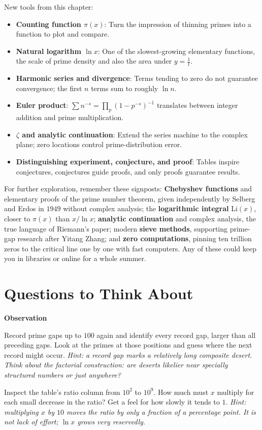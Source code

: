 \begin{toolbox}
New tools from this chapter:
\begin{itemize}
  \item \textbf{Counting function $\pi(x)$}: Turn the impression of thinning primes into a function to plot and compare.
  \item \textbf{Natural logarithm $\ln x$}: One of the slowest-growing elementary functions, the scale of prime density and also the area under $y=\frac1t$.
  \item \textbf{Harmonic series and divergence}: Terms tending to zero do not guarantee convergence; the first $n$ terms sum to roughly $\ln n$.
  \item \textbf{Euler product}: $\sum n^{-s}=\prod_{p}(1-p^{-s})^{-1}$ translates between integer addition and prime multiplication.
  \item \textbf{$\zeta$ and analytic continuation}: Extend the series machine to the complex plane; zero locations control prime-distribution error.
  \item \textbf{Distinguishing experiment, conjecture, and proof}: Tables inspire conjectures, conjectures guide proofs, and only proofs guarantee results.
\end{itemize}
\end{toolbox}

\begin{pandeng}
For further exploration, remember these signposts: \textbf{Chebyshev functions} and elementary proofs of the prime number theorem, given independently by Selberg and Erdos in $1949$ without complex analysis; the \textbf{logarithmic integral} $\mathrm{Li}(x)$, closer to $\pi(x)$ than $x/\ln x$; \textbf{analytic continuation} and complex analysis, the true language of Riemann's paper; modern \textbf{sieve methods}, supporting prime-gap research after Yitang Zhang; and \textbf{zero computations}, pinning ten trillion zeros to the critical line one by one with fast computers. Any of these could keep you in libraries or online for a whole summer.
\end{pandeng}

\section*{Questions to Think About}

\textbf{Observation}
\begin{sikao}
  \item Record prime gaps up to $100$ again and identify every record gap, larger than all preceding gaps. Look at the primes at those positions and guess where the next record might occur. \emph{Hint: a record gap marks a relatively long composite desert. Think about the factorial construction: are deserts likelier near specially structured numbers or just anywhere?}
  \item Inspect the table's ratio column from $10^{2}$ to $10^{9}$. How much must $x$ multiply for each small decrease in the ratio? Get a feel for how slowly it tends to $1$. \emph{Hint: multiplying $x$ by $10$ moves the ratio by only a fraction of a percentage point. It is not lack of effort; $\ln x$ grows very reservedly.}
\end{sikao}

